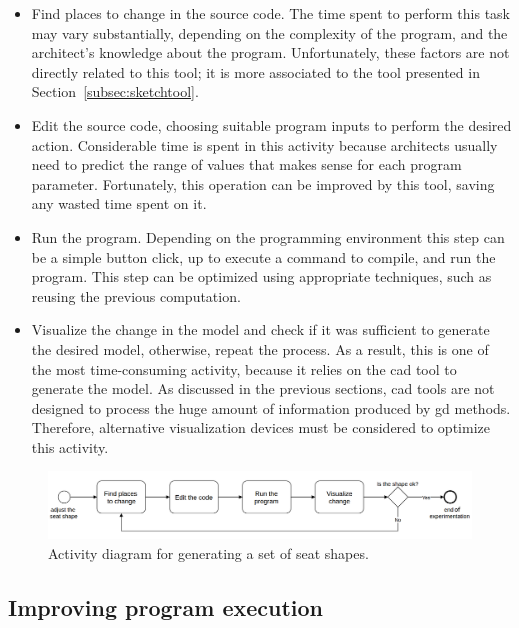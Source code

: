 \begin{itemize}
\item Find places to change in the source code. The time spent to perform this task may vary substantially, depending on the complexity of the program, and the architect's knowledge about the program. Unfortunately, these factors are not directly related to this tool; it is more associated to the tool presented in Section~\ref{subsec:sketchtool}.

\item Edit the source code, choosing suitable program inputs to perform the desired action. Considerable time is spent in this activity because architects usually need to predict the range of values that makes sense for each program parameter. Fortunately, this operation can be improved by this tool, saving any wasted time spent on it.

\item Run the program. Depending on the programming environment this step can be a simple button click, up to execute a command to compile, and run the program. This step can be optimized using appropriate techniques, such as reusing the previous computation.

\item Visualize the change in the model and check if it was sufficient to generate the desired model, otherwise, repeat the process. As a result, this is one of the most time-consuming activity, because it relies on the \gls{cad} tool to generate the model. As discussed in the previous sections, \gls{cad} tools are not designed to process the huge amount of information produced by \gls{gd} methods. Therefore, alternative visualization devices must be considered to optimize this activity.   
\end{itemize}

\begin{figure}[!htbp]
  \centering
  \includegraphics[width=1\textwidth]{images/run-activity}
    \caption{Activity diagram for generating a set of seat shapes.}
  \label{fig:run-activity}
\end{figure}

\subsection{Improving program execution}

